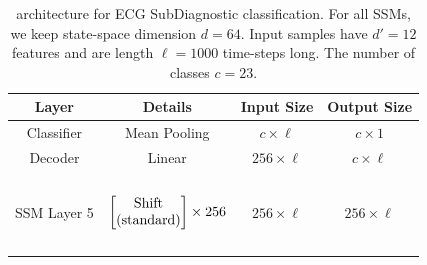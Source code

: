 \begin{table}[]
\centering
\caption{\ourmethod{} architecture for ECG SubDiagnostic classification. For all SSMs, we keep state-space dimension $d = 64$. Input samples have $d' = 12$ features and are length $\ell = 1000$ time-steps long. The number of classes $c = 23$.}
\label{tab:spacetime_ecg_subdiag}
\begin{tabular}{@{}c|c|c|c@{}}
Layer       & Details                                                                                                                                                                                                                                                                                                                 & Input Size        & Output Size       \\ \midrule
Classifier  & Mean Pooling                                                                                                                                                                                                                                                                                                            & $c \times \ell$   & $c \times 1$      \\ \midrule
Decoder     & Linear                                                                                                                                                                                                                                                                                                                  & $256 \times \ell$ & $c \times \ell$   \\ \midrule
SSM Layer 5 & \begin{math}\begin{aligned}    \begin{matrix}    \text{\phantom{-}} \\    \end{matrix}    \\    \begin{bmatrix}    \text{\phantom{-} Shift \phantom{-}} \\ \text{(standard)} \\    \end{bmatrix}    \times 256     \\    \begin{matrix}    \text{\phantom{-}} \\    \end{matrix}    \\\end{aligned}\end{math}              & $256 \times \ell$ & $256 \times \ell$ \\ \midrule

\end{tabular}
\end{table}
